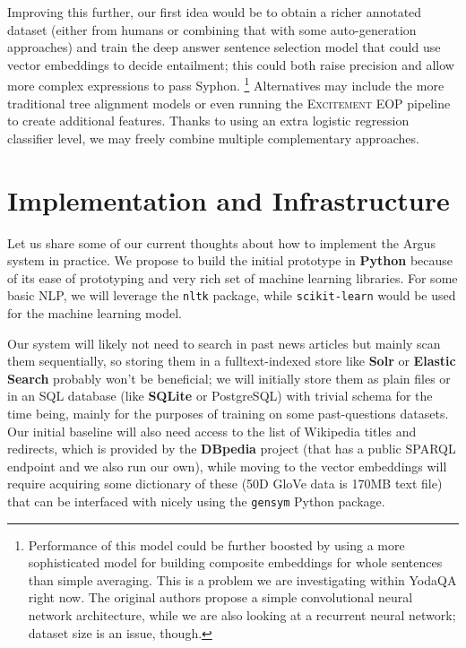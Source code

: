 \documentclass[11pt,a4paper]{article}
\begin{document}
Improving this further, our first idea would be to obtain a richer annotated
dataset (either from humans or combining that with some auto-generation
approaches) and train the deep answer sentence selection model \cite{Yu2014Deep}
that could use vector embeddings to decide entailment; this could both
raise precision and allow more complex expressions to pass Syphon.%
\footnote{Performance of this model could be further boosted by using
a more sophisticated model for building composite embeddings for whole sentences than simple averaging.
This is a problem we are investigating within YodaQA right now.
The original authors propose a simple convolutional neural network architecture,
while we are also looking at a recurrent neural network; dataset size is an issue, though.}
Alternatives may include the more traditional tree alignment models or even
running the \textsc{Excitement EOP} pipeline to create additional features.
Thanks to using an extra logistic regression classifier level, we may freely
combine multiple complementary approaches.

\section{Implementation and Infrastructure}
\label{infra}

Let us share some of our current thoughts about how to implement the Argus system in practice.
We propose to build the initial prototype in \textbf{Python} because of its ease of
prototyping and very rich set of machine learning libraries.
For some basic NLP, we will leverage the \texttt{nltk} package,
while \texttt{scikit-learn} would be used
for the machine learning model.

Our system will likely not need to search in past news articles
but mainly scan them sequentially, so storing them in a fulltext-indexed
store like \textbf{Solr} or \textbf{Elastic Search} probably won't be
beneficial; we will initially store them as plain files or in an SQL
database (like \textbf{SQLite} or PostgreSQL) with trivial schema for the time being,
mainly for the purposes of training on some past-questions datasets.
Our initial baseline will also need access to the list of Wikipedia
titles and redirects, which is provided by the \textbf{DBpedia} project (that
has a public SPARQL endpoint and we also run our own), while moving
to the vector embeddings will require acquiring some dictionary of
these (50D GloVe data is 170MB text file) that can be interfaced with
nicely using the \texttt{gensym} Python package.
\end{document}
